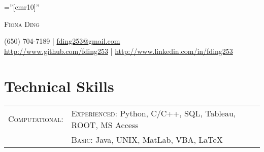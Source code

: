 \documentclass[letterpaper,10pt]{article}
\newif\ifgen
\newif\ifswe
\newif\ifdata
\newif\ifanalyst
\begin{document}

\pagestyle{empty} %

\font\fb=''[cmr10]'' %

\centering
{\Huge\textsc{Fiona Ding}} \par
{\small (650) 704-7189 | 
				\href{mailto:fding253@gmail.com}{fding253@gmail.com}}\\
{\small \href{http://www.github.com/fding253}
					{http://www.github.com/fding253}} | 
{\small \href{http://www.linkedin.com/in/fding253}
					{http://www.linkedin.com/in/fding253}}\par
\ifgen
	\emph{Fast learner with excellent problem-solving and analytical skills.}
\fi
\ifswe
	\emph{Fast-learning software engineer with excellent problem-solving and analytical skills.}
\fi
\ifdata
	\emph{Fast-learning data analyst with excellent problem-solving and analytical skills.}
\fi
\ifanalyst
	\emph{Fast-learning data analyst with excellent problem-solving and analytical skills.}
\fi




\section{Technical Skills}
\begin{tabular}{rp{11cm}}
 \textsc{Computational:}& \textsc{Experienced:} Python, C/C++, SQL, Tableau, ROOT, MS Access \\
 				 	& \textsc{Basic:} Java, UNIX, MatLab, VBA, {\fb \LaTeX}\setmainfont[SmallCapsFont=Fontin-SmallCaps.otf]{Fontin.otf} \\
\end{tabular}
\end{document}
